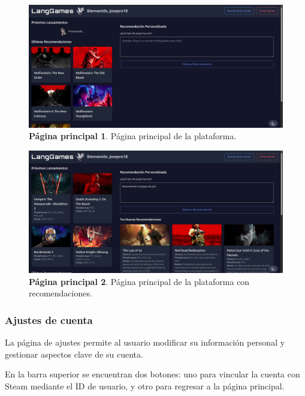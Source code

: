 \begin{figure}[H]
	\centering
	\includegraphics[width=1\linewidth]{imagenes/principal1.png}
	\caption[\textbf{Página principal 1}.]{\textbf{Página principal 1}. Página principal de la plataforma.}
	\label{imagen-principal-1}
\end{figure}

\begin{figure}[H]
	\centering
	\includegraphics[width=1\linewidth]{imagenes/principal2.png}
	\caption[\textbf{Página principal 2}.]{\textbf{Página principal 2}. Página principal de la plataforma con recomendaciones.}
	\label{imagen-principal-2}
\end{figure}



\subsubsection{Ajustes de cuenta}

La página de ajustes permite al usuario modificar su información personal y gestionar aspectos clave de su cuenta.

En la barra superior se encuentran dos botones: uno para vincular la cuenta con Steam mediante el ID de usuario, y otro para regresar a la página principal.

